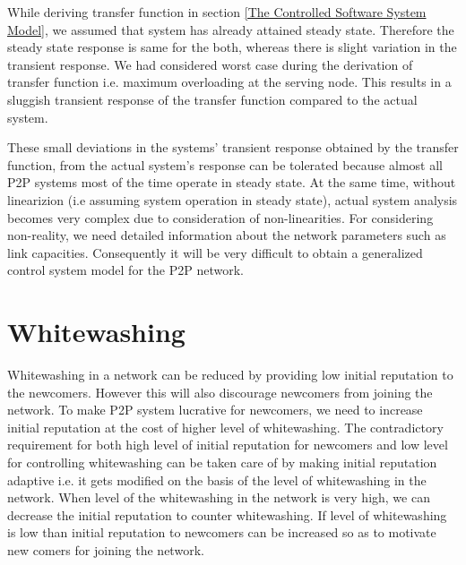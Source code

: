 \documentclass[journal]{IEEEtran}
\begin{document}
While deriving transfer function in section \ref{The Controlled Software System Model}, we assumed that system has already attained steady state. Therefore the steady state response is same for the both, whereas there is slight variation in the transient response. We had considered worst case during the derivation of transfer function i.e. maximum overloading at the serving node. This results in a sluggish transient response of the transfer function compared to the actual system.

These small deviations in the systems' transient response obtained by the transfer function, from the actual system's response can be tolerated because almost all  P2P systems most of the time operate in steady state. At the same time, without linearizion \cite{Ogata} (i.e assuming system operation in steady state), actual system analysis becomes very complex due to consideration of non-linearities. For considering non-reality, we need detailed information about the network parameters such as link capacities. Consequently it will be very difficult to obtain a generalized control system model for the P2P network.  

\section{Whitewashing}
\label{Whitewashing}
Whitewashing in a network can be reduced by providing low initial reputation \cite{Grolimund} to the newcomers. However this will also discourage newcomers from joining the network.  To make P2P system lucrative for newcomers, we need to increase initial reputation at the cost of higher level of whitewashing. The contradictory requirement for both high level of initial reputation for newcomers and low level for controlling whitewashing can be taken care of by making initial reputation adaptive i.e. it gets modified on the basis of the level of whitewashing in the network. When level of the whitewashing in the network is very high, we can decrease the initial reputation to counter whitewashing. If level of whitewashing is low than initial reputation to newcomers can be increased so as to motivate new comers for joining the network. 
\end{document}
